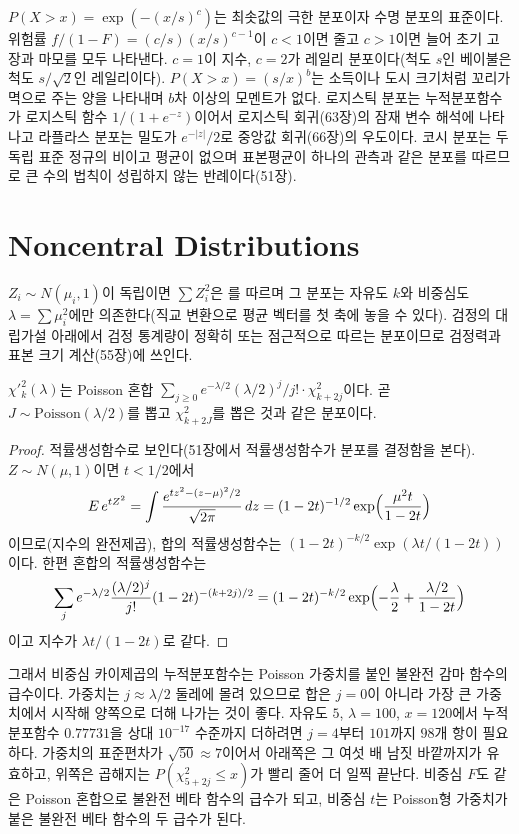  $P(X>x)=\exp(-(x/s)^c)$는 최솟값의 극한 분포이자 수명 분포의 표준이다. 위험률 $f/(1-F)=(c/s)(x/s)^{c-1}$이 $c<1$이면 줄고 $c>1$이면 늘어 초기 고장과 마모를 모두 나타낸다. $c=1$이 지수, $c=2$가 레일리 분포이다(척도 $s$인 베이불은 척도 $s/\sqrt2$인 레일리이다).  $P(X>x)=(s/x)^b$는 소득이나 도시 크기처럼 꼬리가 멱으로 주는 양을 나타내며 $b$차 이상의 모멘트가 없다. 로지스틱 분포는 누적분포함수가 로지스틱 함수 $1/(1+e^{-z})$이어서 로지스틱 회귀(63장)의 잠재 변수 해석에 나타나고 라플라스 분포는 밀도가 $e^{-|z|}/2$로 중앙값 회귀(66장)의 우도이다. 코시 분포는 두 독립 표준 정규의 비이고 평균이 없으며 표본평균이 하나의 관측과 같은 분포를 따르므로 큰 수의 법칙이 성립하지 않는 반례이다(51장).

\section{Noncentral Distributions}
\label{sec:noncentral}

$Z_i\sim N(\mu_i,1)$이 독립이면 $\sum Z_i^2$은 를 따르며 그 분포는 자유도 $k$와 비중심도 $\lambda=\sum\mu_i^2$에만 의존한다(직교 변환으로 평균 벡터를 첫 축에 놓을 수 있다). 검정의 대립가설 아래에서 검정 통계량이 정확히 또는 점근적으로 따르는 분포이므로 검정력과 표본 크기 계산(55장)에 쓰인다.

\begin{proposition}
\label{prop:noncentral-mixture}
$\chi'^2_k(\lambda)$는 Poisson 혼합 $\sum_{j\ge0}e^{-\lambda/2}(\lambda/2)^j/j!\cdot\chi^2_{k+2j}$이다. 곧 $J\sim\mathrm{Poisson}(\lambda/2)$를 뽑고 $\chi^2_{k+2J}$를 뽑은 것과 같은 분포이다.
\end{proposition}

\begin{proof}
적률생성함수로 보인다(51장에서 적률생성함수가 분포를 결정함을 본다). $Z\sim N(\mu,1)$이면 $t<1/2$에서
\[
E\,e^{tZ^2}=\int\frac{e^{tz^2-(z-\mu)^2/2}}{\sqrt{2\pi}}\,dz=(1-2t)^{-1/2}\exp\Bigl(\frac{\mu^2t}{1-2t}\Bigr)
\]
이므로(지수의 완전제곱), 합의 적률생성함수는 $(1-2t)^{-k/2}\exp(\lambda t/(1-2t))$이다. 한편 혼합의 적률생성함수는
\[
\sum_je^{-\lambda/2}\frac{(\lambda/2)^j}{j!}(1-2t)^{-(k+2j)/2}=(1-2t)^{-k/2}\exp\Bigl(-\frac\lambda2+\frac{\lambda/2}{1-2t}\Bigr)
\]
이고 지수가 $\lambda t/(1-2t)$로 같다.
\end{proof}

그래서 비중심 카이제곱의 누적분포함수는 Poisson 가중치를 붙인 불완전 감마 함수의 급수이다. 가중치는 $j\approx\lambda/2$ 둘레에 몰려 있으므로 합은 $j=0$이 아니라 가장 큰 가중치에서 시작해 양쪽으로 더해 나가는 것이 좋다. 자유도 $5$, $\lambda=100$, $x=120$에서 누적분포함수 $0.77731$을 상대 $10^{-17}$ 수준까지 더하려면 $j=4$부터 $101$까지 $98$개 항이 필요하다. 가중치의 표준편차가 $\sqrt{50}\approx7$이어서 아래쪽은 그 여섯 배 남짓 바깥까지가 유효하고, 위쪽은 곱해지는 $P(\chi^2_{5+2j}\le x)$가 빨리 줄어 더 일찍 끝난다. 비중심 $F$도 같은 Poisson 혼합으로 불완전 베타 함수의 급수가 되고, 비중심 $t$는 Poisson형 가중치가 붙은 불완전 베타 함수의 두 급수가 된다.

